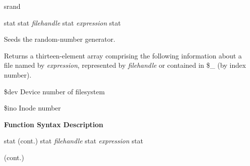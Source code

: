 \documentclass[a4paper,11pt]{book}
\begin{document}
\noindent 

\noindent srand

\noindent 

\noindent stat stat \textit{filehandle }stat \textit{expression }stat

\noindent Seeds the random-number generator.

\noindent 

\noindent 

\noindent Returns a thirteen-element array comprising the following information about a file named by \textit{expression}, represented by \textit{filehandle }or contained in \$\_ (by index number).

\noindent 

 \$dev Device number of filesystem

\noindent 

\noindent 

\noindent 

 \$ino Inode number

\noindent 

\noindent 

\noindent 

\noindent \textbf{Function Syntax Description}

\noindent 

\noindent stat (cont.) stat \textit{filehandle }stat \textit{expression }stat

\noindent (cont.)

\noindent 

\noindent 

\noindent 

\noindent 

\noindent 

\noindent 

\noindent 

\noindent 

\noindent 

\noindent 

\noindent 

\noindent 

\noindent 

\noindent 

\noindent 

\noindent 

\noindent 

\noindent 

\noindent 

\noindent 

\noindent 
\end{document}
